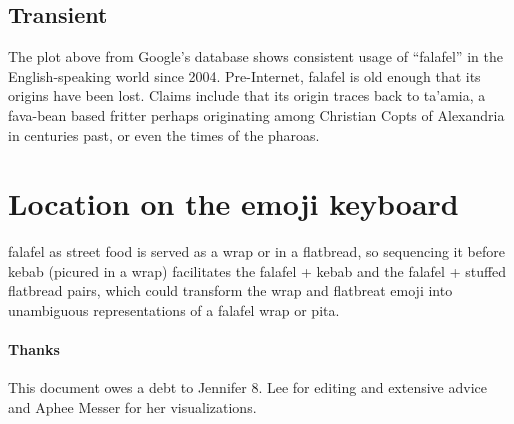 \documentclass[a4paper,10pt]{article}
\begin{document}
\subsection{Transient}

The plot above from Google's database shows consistent usage of ``falafel'' in the
English-speaking world since 2004. Pre-Internet, falafel is old enough that its origins
have been lost. Claims include that its origin traces back to ta'amia, a fava-bean
based fritter perhaps originating among Christian Copts of Alexandria in centuries past,
or even the times of the pharoas.


\section{Location on the emoji keyboard}

{\sc falafel} as street food is served as a wrap or in a flatbread, so sequencing it before {\sc kebab}
(picured in a wrap) facilitates the {\sc falafel} + {\sc kebab} and the {\sc falafel}
+ {\sc stuffed flatbread} pairs, which could transform the wrap and flatbreat emoji
into unambiguous representations of a falafel wrap or pita.

\vfill
\paragraph{Thanks} This document owes a debt to Jennifer 8. Lee for editing and extensive
advice and Aphee Messer for her visualizations.
\end{document}
